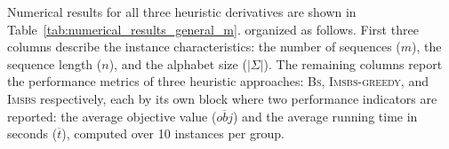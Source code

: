 \documentclass[runningheads]{llncs}
\begin{document}
 
 Numerical results for all three heuristic derivatives are shown in Table~\ref{tab:numerical_results_general_m}.   organized as follows. 
 First three columns describe the instance characteristics: the number of sequences ($m$), the sequence length ($n$), and the alphabet size ($|\Sigma|$).  The remaining columns report the performance metrics of three heuristic approaches: \textsc{Bs}, \textsc{Imsbs-greedy}, and \textsc{Imsbs} respectively, each by its own block where two performance indicators are reported: the average objective value ($\overline{obj}$) and the average running time in seconds ($\overline{t}$), computed over 10 instances per group. 
 
 \begin{table}[!ht]
 	\caption{Numerical results   on the \textsc{Random} benchmark suite. }\label{tab:numerical_results_general_m}
 	\centering
\end{table}
\end{document}
